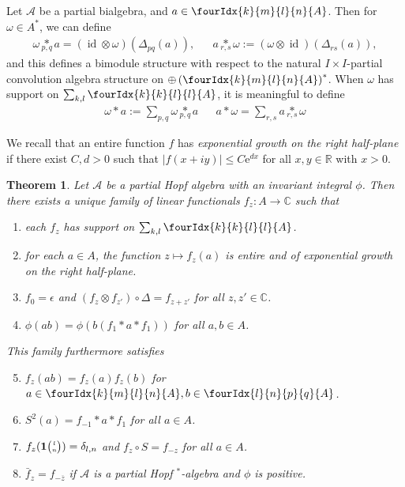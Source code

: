 \documentclass[10pt]{article}
\DeclareMathOperator{\id}{id}
\newcommand{\C}{\mathbb{C}}
\newcommand{\R}{\mathbb{R}}
\newcommand{\Grt}[3]{#1{\tiny {\begin{pmatrix} #2\\#3\end{pmatrix}}}}
\newcommand{\UnitC}[2]{\Grt{\mathbf{1}}{#1}{#2}}
\newcommand{\Gr}[5]{\fourIdx{#2}{#4}{#3}{#5}{#1}}%
\newcommand{\aste}[1]{\underset{#1}{\ast}}
\newtheorem{Theorem}{Theorem}[section]
\theoremstyle{definition}
\numberwithin{equation}{section}
\begin{document}
Let $\mathscr{A}$ be a partial bialgebra, and $a\in \Gr{A}{k}{l}{m}{n}$. Then for $\omega \in A^*$, we can define
\begin{align*} \omega \aste{p,q} a = (\id \otimes \omega) (\Delta_{pq}(a)),&&a \aste{r,s}
\omega:=(\omega \otimes \id)(\Delta_{rs}(a)),\end{align*}and this defines a bimodule structure with respect to the natural $I\times I$-partial convolution algebra structure on $\oplus \left(\Gr{A}{k}{l}{m}{n}\right)^*$. When $\omega$ has support on $\sum_{k,l}\Gr{A}{k}{l}{k}{l}$, it is meaningful to define \begin{align*} \omega\ast a := \sum_{p,q} \omega\aste{p,q}a && a\ast \omega = \sum_{r,s} a\aste{r,s}\omega \end{align*}

We recall that an entire function $f$ has \emph{exponential growth
  on the right half-plane} if there exist $C,d>0$ such that $|f(x+iy)|\leq
C\mathrm{e}^{dx}$  for all $x,y\in \R$ with $x>0$. 

\begin{Theorem} \label{thm:rep-characters} Let $\mathscr{A}$ be a
  partial Hopf algebra with an invariant integral $\phi$.  Then there
  exists a unique family of linear functionals $f_{z} \colon A\to \C$
  such that
\begin{enumerate}[label={(\arabic*)}]
  \item each $f_z$ has support on $\sum_{k,l}\Gr{A}{k}{l}{k}{l}$.
  \item for each $a\in A$, the function $z\mapsto f_{z}(a)$ is entire
    and of exponential growth on the right half-plane.
  \item $f_{0} = \epsilon$ and $(f_{z} \otimes f_{z'}) \circ 
    \Delta= f_{z+z'}$ for all $z,z' \in \C$.
  \item $\phi(ab)=\phi(b(f_{1} \ast a \ast f_{1}))$ for all $a,b\in A$.
  \end{enumerate}
  This family furthermore satisfies
  \begin{enumerate}[label={(\arabic*)}]\setcounter{enumi}{4}
  \item $f_z(ab) = f_z(a)f_z(b)$ for $a\in \Gr{A}{k}{l}{m}{n},b\in \Gr{A}{l}{p}{n}{q}$. 
  \item $S^{2}(a)=f_{-1} \ast a \ast f_{1}$ for all $a\in A$.
  \item $f_{z}(\UnitC{l}{n})=\delta_{l,n}$ and $f_{z} \circ S = f_{-z}$ for all $a\in A$.
  \item $\bar{f}_{z}=f_{-\overline{z}}$ if $\mathscr{A}$ is a partial
    Hopf $^*$-algebra and $\phi$ is positive.
\end{enumerate}
\end{Theorem}
\end{document}
